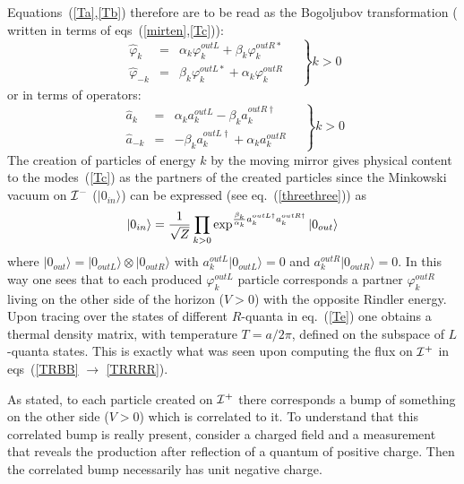 \documentclass[12pt,oneside]{report}
\def\ket#1{|#1\rangle}
\begin{document}
Equations~(\ref{Ta},\ref{Tb}) therefore are to be read as the Bogoljubov
transformation ( written in terms of eqs~(\ref{mirten},\ref{Tc})):
\begin{equation} 
\left. \begin{array}{rclc}
\hat \varphi_k &=& \alpha_k \varphi_k^{out  L} + \beta_k
\varphi_k^{out R *}&\ \\
\hat \varphi_{-k} &=& \beta_{k} 
\varphi_{k}^{out L *} +
\alpha_{k} \varphi_{k}^{out R }&\
\end{array}\right\}k>0
\label{Td}
\end{equation}
or in terms of operators:
\begin{equation}
\left.
\begin{array}{rclc}
\hat a_k &=& \alpha_k a_k^{out L} - \beta_k 
a_k^{out R \dagger}&\\
\hat a_{-k} &=&- \beta_k a^{out L \dagger}_k +
\alpha_{k} a_k^{out R }&\ 
\end{array}\right\}k>0
\label{Tdoplaboum}
\end{equation}
The creation of particles of energy $k$ by the moving mirror gives
physical content to the modes~(\ref{Tc}) as the partners of
the created particles since the Minkowski 
vacuum on ${\cal I}^-$ ($\ket{0_{in}}$)
can be expressed (see eq.~(\ref{threethree})) as
\begin{equation}
\ket{0_{in}} = {1 \over \sqrt{Z}}
\prod_{k>0} \exp^{{\beta_k \over \alpha_k} 
a_k^{out L \dagger}a_k^{out  R  \dagger}} \ket{0_{out}}
\label{Te}
\end{equation}
where $\ket{0_{out}} =\ket{0_{out L}}\otimes\ket{0_{out R}}
$
with $a_k^{out  L}\ket{0_{out L}} =0$ and  $a_k^{out  R}\ket{0_{out R}} =0$. 
In this way one sees that to each produced
$\varphi_k^{out  L}$ particle corresponds a partner 
$\varphi_k^{out  R}$ living on the other side of the horizon
($V>0$) with the opposite Rindler energy. 
 Upon tracing over the states of different
$R$-quanta in eq.~(\ref{Te}) one obtains a
thermal density matrix,  with
temperature $T= a/ 2 \pi$, defined  on the subspace of  $L$-quanta states.
This is exactly what was seen upon computing the flux on ${\cal{I}}^+$ in
eqs~(\ref{TRBB} $\to$ \ref{TRRRR}).

As stated, to each particle created on ${\cal{I}}^+$ there corresponds  a 
bump of something on the other side ($V>0$) which is correlated to it. To
understand that 
this
correlated bump is really present, consider a charged
field and a measurement that reveals the production after reflection of a
quantum of positive charge. Then the correlated bump
necessarily has unit negative charge. 
\end{document}

